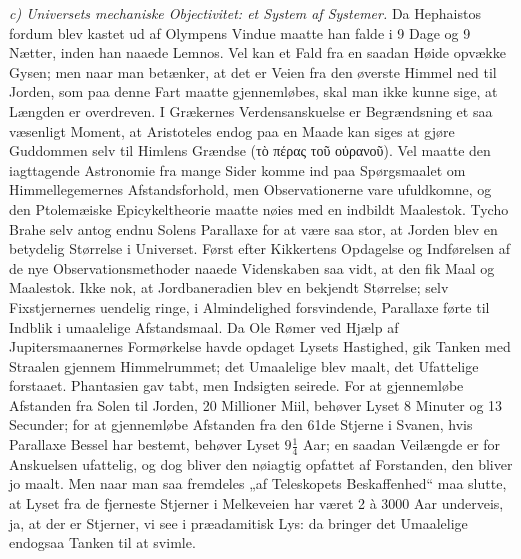 \documentclass[12pt,a4paper]{book}
\newcommand{\runin}[1]{\emph{#1}\hspace{0.4em}}
\begin{document}
\runin{c) Universets mechaniske Objectivitet: et System af Systemer.}
Da Hephaistos fordum blev kastet ud af Olympens Vindue maatte han falde
i 9 Dage og 9 Nætter, inden han naaede Lemnos. Vel kan et Fald fra en
saadan Høide opvække Gysen; men naar man betænker, at det er Veien fra
den øverste Himmel ned til Jorden, som paa denne Fart maatte
gjennemløbes, skal man ikke kunne sige, at Længden er overdreven. I
Grækernes Verdensanskuelse er Begrændsning et saa væsenligt Moment, at
Aristoteles endog paa en Maade kan siges at gjøre Guddommen selv til
Himlens Grændse (τὸ πέρας τοῦ οὐρανοῦ). Vel maatte den iagttagende
Astronomie fra mange Sider komme ind paa Spørgsmaalet om
Himmellegemernes Afstandsforhold, men Observationerne vare ufuldkomne,
og den Ptolemæiske Epicykeltheorie maatte nøies med en indbildt
Maalestok. Tycho Brahe selv antog endnu Solens Parallaxe for at være
saa stor, at Jorden blev en betydelig Størrelse i Universet. Først
efter Kikkertens Opdagelse og Indførelsen af de nye
Observationsmethoder naaede Videnskaben saa vidt, at den fik Maal og
Maalestok. Ikke nok, at Jordbaneradien blev en bekjendt Størrelse; selv
Fixstjernernes uendelig ringe, i Almindelighed forsvindende, Parallaxe
førte til Indblik i umaalelige Afstandsmaal. Da Ole Rømer ved Hjælp af
Jupitersmaanernes Formørkelse havde opdaget Lysets Hastighed, gik
Tanken med Straalen gjennem Himmelrummet; det Umaalelige blev maalt,
det Ufattelige forstaaet. Phantasien gav tabt, men Indsigten seirede.
For at gjennemløbe Afstanden fra Solen til Jorden, 20 Millioner Miil,
behøver Lyset 8 Minuter og 13 Secunder; for at gjennemløbe Afstanden
fra den 61de Stjerne i Svanen, hvis Parallaxe Bessel har bestemt,
behøver Lyset $9\tfrac{1}{4}$ Aar; en saadan
Veilængde er for Anskuelsen ufattelig, og dog bliver den nøiagtig
opfattet af Forstanden, den bliver jo maalt. Men naar man saa fremdeles
„af Teleskopets Beskaffenhed“ maa slutte, at Lyset fra de fjerneste
Stjerner i Melkeveien har været 2 à 3000 Aar underveis, ja, at der er
Stjerner, vi see i præadamitisk Lys: da bringer det Umaalelige endogsaa
Tanken til at svimle.
\end{document}
